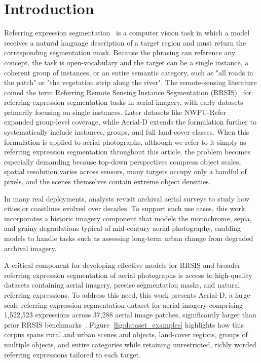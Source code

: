 
\section{Introduction}
\label{sec:intro}

Referring expression segmentation~\cite{kazemzadeh2014referit,hu2016segmentation,yu2016modeling} is a computer vision task in which a model receives a natural language description of a target region and must return the corresponding segmentation mask. Because the phrasing can reference any concept, the task is open-vocabulary and the target can be a single instance, a coherent group of instances, or an entire semantic category, such as "all roads in the patch" or "the vegetation strip along the river". The remote-sensing literature coined the term Referring Remote Sensing Instance Segmentation (RRSIS)~\cite{yuan2023rrsis} for referring expression segmentation tasks in aerial imagery, with early datasets primarily focusing on single instances. Later datasets like NWPU-Refer~\cite{yang2024large} expanded group-level coverage, while Aerial-D extends the formulation further to systematically include instances, groups, and full land-cover classes. When this formulation is applied to aerial photographs, although we refer to it simply as referring expression segmentation throughout this article, the problem becomes especially demanding because top-down perspectives compress object scales, spatial resolution varies across sensors, many targets occupy only a handful of pixels, and the scenes themselves contain extreme object densities.

In many real deployments, analysts revisit archival aerial surveys to study how cities or coastlines evolved over decades. To support such use cases, this work incorporates a historic imagery component that models the monochrome, sepia, and grainy degradations typical of mid-century aerial photography, enabling models to handle tasks such as assessing long-term urban change from degraded archival imagery.

A critical component for developing effective models for RRSIS and broader referring expression segmentation of aerial photographs is access to high-quality datasets containing aerial imagery, precise segmentation masks, and natural referring expressions. To address this need, this work presents Aerial-D, a large-scale referring expression segmentation dataset for aerial imagery comprising 1,522,523 expressions across 37,288 aerial image patches, significantly larger than prior RRSIS benchmarks~\cite{yuan2023rrsis,liu2024rotated,yang2024large}. Figure~\ref{fig:dataset_examples} highlights how this corpus spans rural and urban scenes and objects, land-cover regions, groups of multiple objects, and entire categories while retaining unrestricted, richly worded referring expressions tailored to each target.

